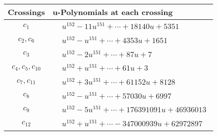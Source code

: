 \documentclass[1p]{elsarticle_modified}
\theoremstyle{definition}
\begin{document}
\begin{tabular}{m{50pt}|m{274pt}}
Crossings & \hspace{64pt}u-Polynomials at each crossing \\
\hline $$\begin{aligned}c_{1}\end{aligned}$$&$\begin{aligned}
&u^{152}-11 u^{151}+\cdots+18140 u+5351
\end{aligned}$\\
\hline $$\begin{aligned}c_{2},c_{6}\end{aligned}$$&$\begin{aligned}
&u^{152}- u^{151}+\cdots+4353 u+1651
\end{aligned}$\\
\hline $$\begin{aligned}c_{3}\end{aligned}$$&$\begin{aligned}
&u^{152}-2 u^{151}+\cdots+87 u+7
\end{aligned}$\\
\hline $$\begin{aligned}c_{4},c_{5},c_{10}\end{aligned}$$&$\begin{aligned}
&u^{152}+u^{151}+\cdots+61 u+3
\end{aligned}$\\
\hline $$\begin{aligned}c_{7},c_{11}\end{aligned}$$&$\begin{aligned}
&u^{152}+3 u^{151}+\cdots+61152 u+8128
\end{aligned}$\\
\hline $$\begin{aligned}c_{8}\end{aligned}$$&$\begin{aligned}
&u^{152}- u^{151}+\cdots+57030 u+6997
\end{aligned}$\\
\hline $$\begin{aligned}c_{9}\end{aligned}$$&$\begin{aligned}
&u^{152}-5 u^{151}+\cdots+176391091 u+46936013
\end{aligned}$\\
\hline $$\begin{aligned}c_{12}\end{aligned}$$&$\begin{aligned}
&u^{152}+u^{151}+\cdots-347000939 u+62972897
\end{aligned}$\\
\hline
\end{tabular}\\~\\
\end{document}
